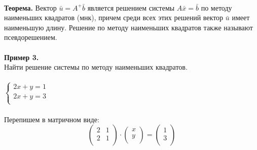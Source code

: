 \documentclass[12pt]{article}
\theoremstyle{definition}
\numberwithin{equation}{section}
\begin{document}
\\
\textbf{Теорема.}
Вектор $\bar u = A^+ \bar b$ является решением системы $A\bar x = \bar b$ по методу наименьших квадратов (мнк), причем среди всех этих решений вектор $\bar u$ имеет наименьшую длину. Решение по методу наименьших квадратов также называют псевдорешением.\\
\\
\textbf{Пример 3.}\\ 
Найти решение системы по методу наименьших квадратов.\\ \\
$
\left\{  
\begin{array}{ccl}  
    2x+y=1\\
    2x+y=3\\
\end{array}   
\right.  
$
\\ 
\\Перепишем в матричном виде:\\
\[\begin{pmatrix}
2 & 1 \\         
2 & 1 \\
\end{pmatrix} \cdot \begin{pmatrix}
x \\         
y \\
\end{pmatrix} = \begin{pmatrix}
1 \\         
3 \\
\end{pmatrix}\]\\
\end{document}
